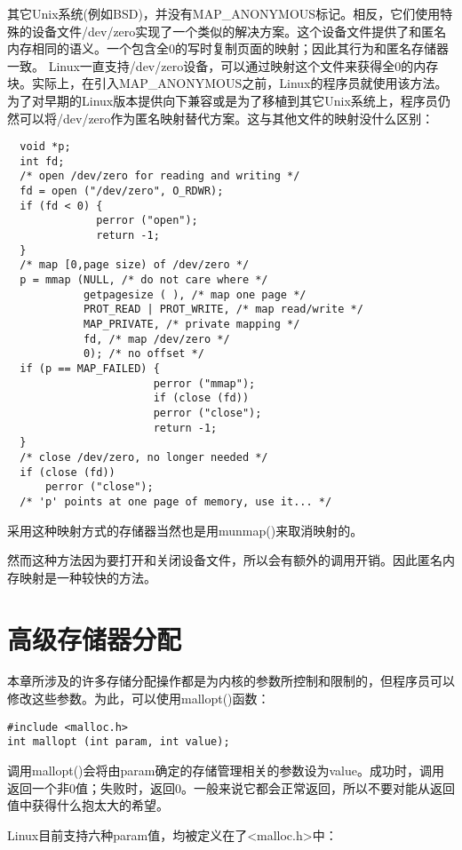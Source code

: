 其它Unix系统(例如BSD)，并没有MAP\_ANONYMOUS标记。相反，它们使用特殊的设备文件/dev/zero实现了一个类似的解决方案。这个设备文件提供了和匿名内存相同的语义。一个包含全0的写时复制页面的映射；因此其行为和匿名存储器一致。 Linux一直支持/dev/zero设备，可以通过映射这个文件来获得全0的内存块。实际上，在引入MAP\_ANONYMOUS之前，Linux的程序员就使用该方法。为了对早期的Linux版本提供向下兼容或是为了移植到其它Unix系统上，程序员仍然可以将/dev/zero作为匿名映射替代方案。这与其他文件的映射没什么区别： 

\begin{lstlisting}
  void *p;
  int fd;
  /* open /dev/zero for reading and writing */
  fd = open ("/dev/zero", O_RDWR);
  if (fd < 0) {
              perror ("open");
              return -1;
  }
  /* map [0,page size) of /dev/zero */
  p = mmap (NULL, /* do not care where */
            getpagesize ( ), /* map one page */
            PROT_READ | PROT_WRITE, /* map read/write */
            MAP_PRIVATE, /* private mapping */
            fd, /* map /dev/zero */
            0); /* no offset */
  if (p == MAP_FAILED) {
                       perror ("mmap");
                       if (close (fd))
                       perror ("close");
                       return -1;
  }
  /* close /dev/zero, no longer needed */
  if (close (fd))
      perror ("close");
  /* 'p' points at one page of memory, use it... */ 
\end{lstlisting}

采用这种映射方式的存储器当然也是用munmap()来取消映射的。

然而这种方法因为要打开和关闭设备文件，所以会有额外的调用开销。因此匿名内存映射是一种较快的方法。 

\section{高级存储器分配}

本章所涉及的许多存储分配操作都是为内核的参数所控制和限制的，但程序员可以修改这些参数。为此，可以使用mallopt()函数： 

\begin{lstlisting}
#include <malloc.h>
int mallopt (int param, int value);
\end{lstlisting}

调用mallopt()会将由param确定的存储管理相关的参数设为value。成功时，调用返回一个非0值；失败时，返回0。一般来说它都会正常返回，所以不要对能从返回值中获得什么抱太大的希望。

Linux目前支持六种param值，均被定义在了<malloc.h>中： 


